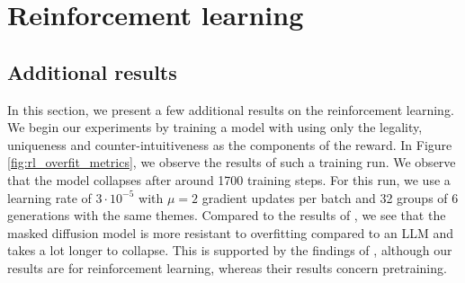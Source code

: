 \begin{table}[h]
    \centering
    \caption{The final metrics after supervised training with different context distributions. The sampling is performed with a temperature $0.1$ and $256$ denoising steps.}
    \label{tab:supervised metrics low temperature}
\end{table}


\section{Reinforcement learning}
\label{sec:RL appendix}

\subsection{Additional results}

In this section, we present a few additional results on the reinforcement learning. We begin our experiments by training a model with using only the legality, uniqueness and counter-intuitiveness as the components of the reward. In Figure \ref{fig:rl_overfit_metrics}, we observe the results of such a training run. We observe that the model collapses after around 1700 training steps. For this run, we use a learning rate of $3\cdot10^{-5}$ with $\mu=2$ gradient updates per batch and 32 groups of 6 generations with the same themes. Compared to the results of \citeauthor{feng2025generatingcreativechesspuzzles}, we see that the masked diffusion model is more resistant to overfitting compared to an LLM and takes a lot longer to collapse. This is supported by the findings of \citeauthor{nie2025scalingmaskeddiffusionmodels}, although our results are for reinforcement learning, whereas their results concern pretraining.

